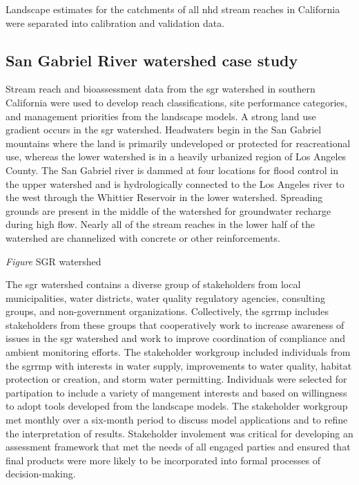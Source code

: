 \documentclass[]{article}
\begin{document}
Landscape estimates for the catchments of all \ac{nhd} stream reaches in
California were separated into calibration and validation data.

\subsection{San Gabriel River watershed case
study}\label{san-gabriel-river-watershed-case-study}

Stream reach and bioassessment data from the \ac{sgr} watershed in
southern California were used to develop reach classifications, site
performance categories, and management priorities from the landscape
models. A strong land use gradient occurs in the \ac{sgr} watershed.
Headwaters begin in the San Gabriel mountains where the land is
primarily undeveloped or protected for reacreational use, whereas the
lower watershed is in a heavily urbanized region of Los Angeles County.
The San Gabriel river is dammed at four locations for flood control in
the upper watershed and is hydrologically connected to the Los Angeles
river to the west through the Whittier Reservoir in the lower watershed.
Spreading grounds are present in the middle of the watershed for
groundwater recharge during high flow. Nearly all of the stream reaches
in the lower half of the watershed are channelized with concrete or
other reinforcements.

\emph{Figure} SGR watershed

The \ac{sgr} watershed contains a diverse group of stakeholders from
local municipalities, water districts, water quality regulatory
agencies, consulting groups, and non-government organizations.
Collectively, the \ac{sgrrmp} includes stakeholders from these groups
that cooperatively work to increase awareness of issues in the \ac{sgr}
watershed and work to improve coordination of compliance and ambient
monitoring efforts. The stakeholder workgroup included individuals from
the \ac{sgrrmp} with interests in water supply, improvements to water
quality, habitat protection or creation, and storm water permitting.
Individuals were selected for partipation to include a variety of
mangement interests and based on willingness to adopt tools developed
from the landscape models. The stakeholder workgroup met monthly over a
six-month period to discuss model applications and to refine the
interpretation of results. Stakeholder involement was critical for
developing an assessment framework that met the needs of all engaged
parties and ensured that final products were more likely to be
incorporated into formal processes of decision-making.
\end{document}

